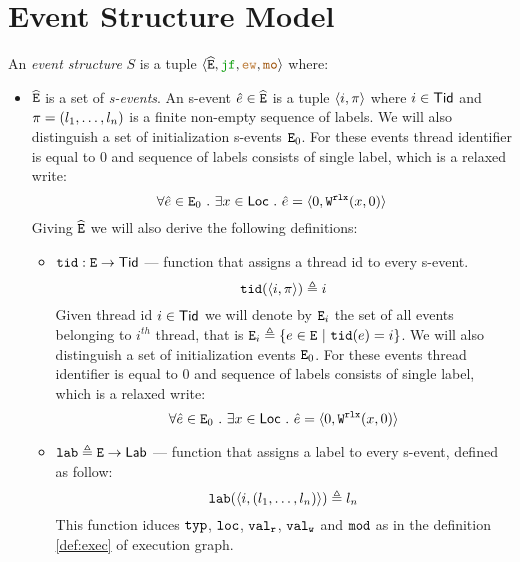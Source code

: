 \documentclass[12pt]{article}
\begin{document}
\section{Event Structure Model}

\begin{definition}
  \label{def:es}
  
  An \emph{event structure} $S$ is a tuple
  $\tup{\lEs, \lJF, \lEW, \lMO}$ where:
  \begin{itemize}
    \item $\widehat{{\mathtt{E}}}$ is a set of \emph{s-events}.
    An s-event $\hat{e} \in \widehat{{\mathtt{E}}}$ is a tuple $\langle i, \pi \rangle$
    where $i \in \mathsf{Tid}$ and $\pi = (l_1, \dots, l_n)$ is a finite non-empty sequence of labels.
    We will also distinguish a set of initialization s-events ${\mathtt{E}}_{0}$.
    For these events thread identifier is equal to 0 and
    sequence of labels consists of single label, which is a relaxed write:
    \begin{equation*}
      \forall{\hat{e} \in {\mathtt{E}}_{0}} ~.~ \exists{x \in \mathsf{Loc}} ~.~ \hat{e} = \langle 0, {\mathtt{W}}^{\mathtt{rlx}}({x},{0}) \rangle
    \end{equation*}
    Giving $\widehat{{\mathtt{E}}}$ we will also derive the following definitions:

    \begin{itemize}
      
      \item ${\mathtt{tid}} : {\mathtt{E}} \rightarrow \mathsf{Tid}$ --- function that assigns a thread id to every s-event.
      \begin{equation*}
        {\mathtt{tid}}(\langle i, \pi \rangle) \triangleq i
      \end{equation*}
      Given thread id $i \in \mathsf{Tid}$ we will denote by ${\mathtt{E}}_{i}$ the set of all events belonging 
      to $i^{th}$ thread, that is ${\mathtt{E}}_{i} \triangleq \{e \in {\mathtt{E}} ~|~ {\mathtt{tid}}(e) = i\}$.
      We will also distinguish a set of initialization events ${\mathtt{E}}_{0}$.
      For these events thread identifier is equal to 0 and
      sequence of labels consists of single label, which is a relaxed write:
      \begin{equation*}
        \forall{\hat{e} \in {\mathtt{E}}_{0}} ~.~ \exists{x \in \mathsf{Loc}} ~.~ \hat{e} = \langle 0, {\mathtt{W}}^{\mathtt{rlx}}({x},{0}) \rangle
      \end{equation*}

      \item ${\mathtt{lab}} \triangleq {\mathtt{E}} \rightarrow \mathsf{Lab}$ --- function that assigns a label to every s-event,
      defined as follow:
      \begin{equation*}
        {\mathtt{lab}}(\langle i, (l_1, \dots, l_n) \rangle) \triangleq l_n
      \end{equation*}
      This function iduces ${\mathtt{typ}}$, ${\mathtt{loc}}$, ${\mathtt{val_r}}$, ${\mathtt{val_w}}$ and ${\mathtt{mod}}$
      as in the definition \ref{def:exec} of execution graph.


\end{itemize}
\end{itemize}
\end{definition}
\end{document}

